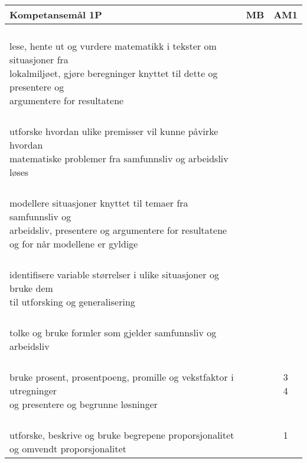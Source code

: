 \documentclass{article}
\begin{document}
\begin{center}
	\begin{tabular}{p{10.5cm} | c | c |} 
		\textbf{Kompetansemål 1P} & \textbf{MB} & \textbf{AM1}\\ \hline
		\shortstack[l]{\\ lese, hente ut og vurdere matematikk i tekster om situasjoner fra \\lokalmiljøet, gjøre beregninger knyttet til dette og presentere og\\ argumentere for resultatene
		} &\shortstack{} &\shortstack{} \\ \hline
		
		\shortstack[l]{\\ utforske hvordan ulike premisser vil kunne påvirke hvordan \\matematiske problemer fra samfunnsliv og arbeidsliv løses
		} &\shortstack{} &\shortstack{} \\ \hline
		
		\shortstack[l]{\\ modellere situasjoner knyttet til temaer fra samfunnsliv og \\arbeidsliv, presentere og argumentere for resultatene\\ og for når modellene er gyldige
		} &\shortstack{} &\shortstack{} \\ \hline
		
		\shortstack[l]{\\ identifisere variable størrelser i ulike situasjoner og bruke dem \\til utforsking og generalisering
		} &\shortstack{10} &\shortstack{alle} \\ \hline
		
		\shortstack[l]{\\ tolke og bruke formler som gjelder samfunnsliv og arbeidsliv
		} &\shortstack{} &\shortstack{alle} \\ \hline
		
		\shortstack[l]{\\ bruke prosent, prosentpoeng, promille og vekstfaktor i utregninger \\og presentere og begrunne løsninger
		} &\shortstack{} &\shortstack{3\\4} \\ \hline
		
		\shortstack[l]{\\ utforske, beskrive og bruke begrepene proporsjonalitet\\ og omvendt proporsjonalitet
		} &\shortstack{} &\shortstack{1\\{}} \\ \hline
		

\end{tabular}
\end{center}
\end{document}
